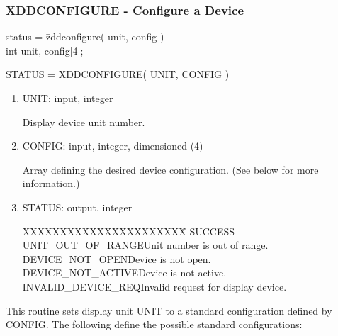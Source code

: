 \subsubsection{XDDCONFIGURE - Configure a Device}
\begin{tabbing}
status = \=zddconfigure( unit, config )\\
\>int  unit, config[4];\\
\end{tabbing}
STATUS = XDDCONFIGURE( UNIT, CONFIG )
\begin{enumerate}
\item UNIT:  input, integer

Display device unit number.
\item CONFIG:  input, integer, dimensioned (4)

Array defining the desired device configuration.  (See below for more
information.)
\item STATUS:  output, integer
\begin{tabbing}
XXXXXXXXXXXXXXXXXXXXXX\=\kill
SUCCESS\\
UNIT\_OUT\_OF\_RANGE\>Unit number is out of range.\\
DEVICE\_NOT\_OPEN\>Device is not open.\\
DEVICE\_NOT\_ACTIVE\>Device is not active.\\
INVALID\_DEVICE\_REQ\>Invalid request for display device.\\
\end{tabbing}
\end{enumerate}
This routine sets display unit UNIT to a standard configuration
defined by CONFIG.  The following define the possible standard
configurations:
